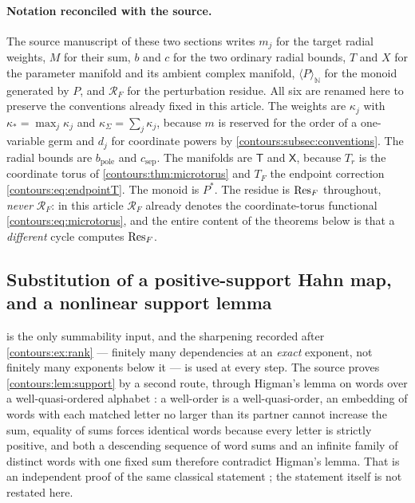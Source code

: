 \documentclass[11pt,letterpaper]{article}
\theoremstyle{definition}
\theoremstyle{remark}
\newcommand{\N}{\mathbb N}\newcommand{\Z}{\mathbb Z}\newcommand{\DD}{\mathbb D}
\numberwithin{equation}{section}
\begin{document}
\paragraph{Notation reconciled with the source.}
The source manuscript of these two sections writes $m_j$ for the target radial
weights, $M$ for their sum, $b$ and $c$ for the two ordinary radial bounds,
$T$ and $X$ for the parameter manifold and its ambient complex manifold,
$\langle P\rangle_\N$ for the monoid generated by $P$, and $\mathcal R_F$ for
the perturbation residue. All six are renamed here to preserve the conventions
already fixed in this article. The weights are $\kappa_j$ with
$\kappa_*=\max_j\kappa_j$ and $\kappa_\Sigma=\sum_j\kappa_j$, because $m$ is
reserved for the order of a one-variable germ and $d_j$ for coordinate powers
by \cref{contours:subsec:conventions}. The radial bounds are
$b_{\mathrm{pole}}$ and $c_{\mathrm{sep}}$. The manifolds are $\mathsf T$ and
$\mathsf X$, because $T_r$ is the coordinate torus of
\cref{contours:thm:microtorus} and $T_F$ the endpoint correction
\eqref{contours:eq:endpointT}. The monoid is $P^*$. The residue is
$\operatorname{Res}_F$ throughout, \emph{never} $\mathcal R_F$: in this article
$\mathcal R_F$ already denotes the coordinate-torus functional
\eqref{contours:eq:microtorus}, and the entire content of the theorems below is
that a \emph{different} cycle computes $\operatorname{Res}_F$.

\subsection{Substitution of a positive-support Hahn map, and a nonlinear
support lemma}
\label{contours:subsec:hahnsub}
 is the only summability input, and the sharpening
recorded after \cref{contours:ex:rank} --- finitely many dependencies at an
\emph{exact} exponent, not finitely many exponents below it --- is used at every
step. The source proves \cref{contours:lem:support} by a second route, through
Higman's lemma on words over a well-quasi-ordered alphabet \cite{Higman}: a
well-order is a well-quasi-order, an embedding of words with each matched letter
no larger than its partner cannot increase the sum, equality of sums forces
identical words because every letter is strictly positive, and both a descending
sequence of word sums and an infinite family of distinct words with one fixed sum
therefore contradict Higman's lemma. That is an independent proof of the same
classical statement \cite{Neumann,Higman}; the statement itself is not restated
here.
\end{document}

